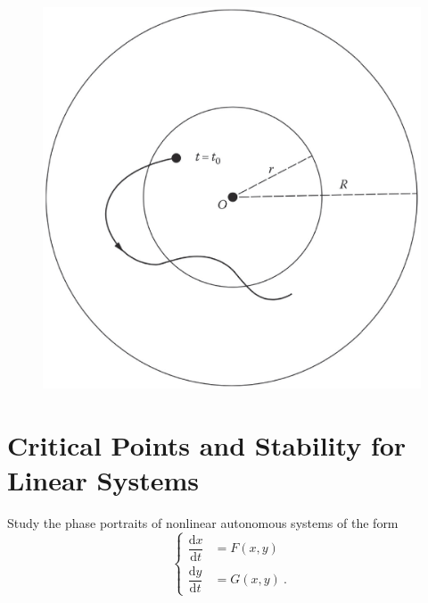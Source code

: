 \documentclass[12pt,a4paper]{article}
\newcommand{\dif}{\mathrm{d}}
\begin{document}
\begin{figure}
\centering
\includegraphics[height=9.cm, angle=0]{stable.eps}
\caption{
}
\label{fig:stable}
\end{figure}

\section{Critical Points and Stability for Linear Systems}
\cite{george1991differential, simmons2016differential} Study the phase portraits of nonlinear autonomous systems of the form
\begin{equation}
\left\{
\begin{aligned}
\dfrac{\dif x}{\dif t} & =  F(x,y) \\
\dfrac{\dif y}{\dif t} & =  G(x, y) ~.
\end{aligned}
\right.
\label{eq:nonlinear_gen}
\end{equation}
\end{document}
